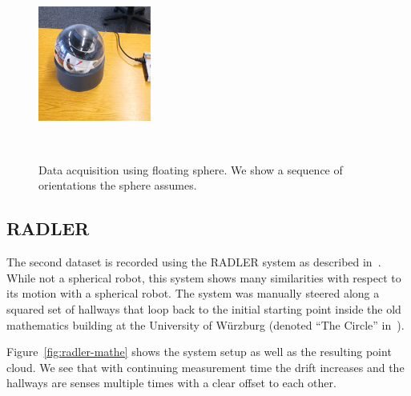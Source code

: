 \begin{figure}
\begin{minipage}[c]{0.5\textwidth}
		\includegraphics[width=0.33\textwidth]{./images/sphere-frame-6.eps}\hfill
	\end{minipage}\\
	\caption{Data acquisition using floating sphere. We show a sequence of orientations the sphere assumes.}
	\label{fig:float-sat-sphere}
\end{figure}

\iffalse %
	\subsection{RADLER}

	The second dataset is recorded using the RADLER system as described in~\cite{Borrmann2020-RADLER}.
	While not a spherical robot, this system shows many similarities with respect to its motion with a spherical robot.
	The system was manually steered along a squared set of hallways that loop back to the initial starting point inside the old mathematics building at the University of Würzburg (denoted ``The Circle'' in~\cite{Borrmann2020-RADLER}).

	Figure~\ref{fig:radler-mathe} shows the system setup as well as the resulting point cloud.
	We see that with continuing measurement time the drift increases and the hallways are senses multiple times with a clear offset to each other. 

